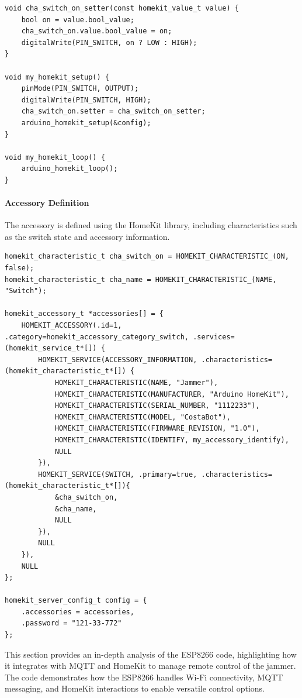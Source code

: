 \begin{verbatim}
void cha_switch_on_setter(const homekit_value_t value) {
    bool on = value.bool_value;
    cha_switch_on.value.bool_value = on;
    digitalWrite(PIN_SWITCH, on ? LOW : HIGH);
}

void my_homekit_setup() {
    pinMode(PIN_SWITCH, OUTPUT);
    digitalWrite(PIN_SWITCH, HIGH);
    cha_switch_on.setter = cha_switch_on_setter;
    arduino_homekit_setup(&config);
}

void my_homekit_loop() {
    arduino_homekit_loop();
}
\end{verbatim}

\paragraph{Accessory Definition}
The accessory is defined using the HomeKit library, including characteristics such as the switch state and accessory information.

\begin{verbatim}
homekit_characteristic_t cha_switch_on = HOMEKIT_CHARACTERISTIC_(ON, false);
homekit_characteristic_t cha_name = HOMEKIT_CHARACTERISTIC_(NAME, "Switch");

homekit_accessory_t *accessories[] = {
    HOMEKIT_ACCESSORY(.id=1, .category=homekit_accessory_category_switch, .services=(homekit_service_t*[]) {
        HOMEKIT_SERVICE(ACCESSORY_INFORMATION, .characteristics=(homekit_characteristic_t*[]) {
            HOMEKIT_CHARACTERISTIC(NAME, "Jammer"),
            HOMEKIT_CHARACTERISTIC(MANUFACTURER, "Arduino HomeKit"),
            HOMEKIT_CHARACTERISTIC(SERIAL_NUMBER, "1112233"),
            HOMEKIT_CHARACTERISTIC(MODEL, "CostaBot"),
            HOMEKIT_CHARACTERISTIC(FIRMWARE_REVISION, "1.0"),
            HOMEKIT_CHARACTERISTIC(IDENTIFY, my_accessory_identify),
            NULL
        }),
        HOMEKIT_SERVICE(SWITCH, .primary=true, .characteristics=(homekit_characteristic_t*[]){
            &cha_switch_on,
            &cha_name,
            NULL
        }),
        NULL
    }),
    NULL
};

homekit_server_config_t config = {
    .accessories = accessories,
    .password = "121-33-772"
};
\end{verbatim}

This section provides an in-depth analysis of the ESP8266 code, highlighting how it integrates with MQTT and HomeKit to manage remote control of the jammer. The code demonstrates how the ESP8266 handles Wi-Fi connectivity, MQTT messaging, and HomeKit interactions to enable versatile control options.
